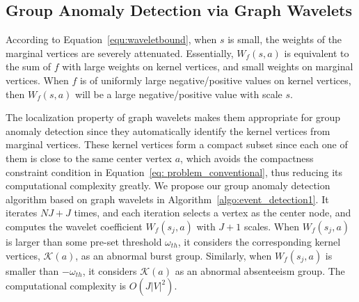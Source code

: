 


\subsection{Group Anomaly Detection via Graph Wavelets}
\label{sec:Group_Anomaly_Detection_via_graph_wavelet}
According to Equation~\ref{equ:waveletbound}, when $s$ is small, the weights of the marginal vertices are severely attenuated.
Essentially, $W_f(s,a)$ is equivalent to the sum of $f$ with large weights on kernel vertices, and small weights on marginal vertices.
When $f$ is of uniformly large negative/positive values on kernel vertices, then $W_f(s,a)$ will be a large negative/positive value with scale $s$.

The localization property of graph wavelets makes them appropriate for group anomaly detection since they automatically identify the kernel vertices from marginal vertices. These kernel vertices form a compact subset since each one of them is close to the same center vertex $a$, which avoids the compactness constraint condition in Equation~\ref{eq: problem_conventional}, thus reducing
its computational complexity greatly. We propose our group anomaly detection algorithm based on graph wavelets in Algorithm~\ref{algo:event_detection1}. It iterates $NJ+J$ times, and each iteration selects a vertex as the center node, and computes the wavelet coefficient $W_f(s_j, a)$ with $J+1$ scales. When $W_f(s_j, a)$ is larger than some pre-set threshold $\omega_{th}$, it considers the corresponding kernel vertices, $\mathcal{K}(a)$, as an abnormal burst group. Similarly, when $W_f(s_j, a)$ is smaller than $-\omega_{th}$, it considers $\mathcal{K}(a)$ as an abnormal absenteeism group. The computational complexity is $O(J|V|^2)$.

